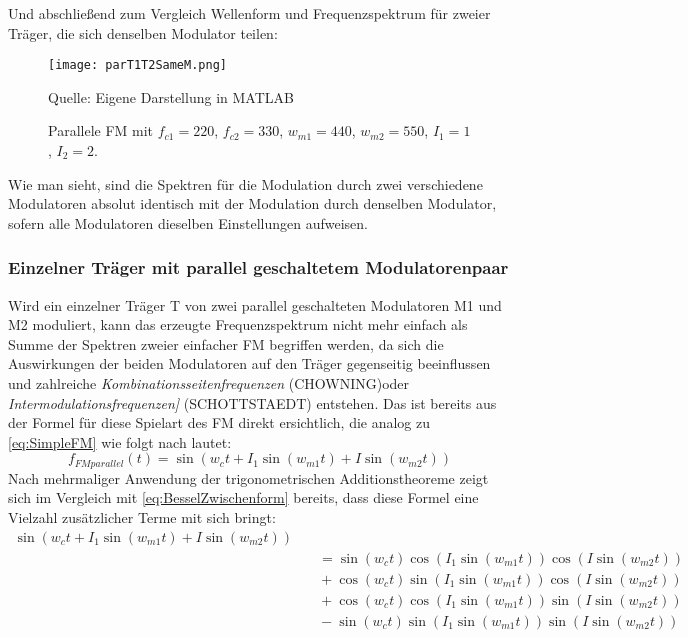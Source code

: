 \FloatBarrier
Und abschließend zum Vergleich Wellenform und Frequenzspektrum für zweier Träger, die sich denselben Modulator teilen:
\FloatBarrier
\begin{figure} [ht]
\centering
  \texttt{[image: parT1T2SameM.png]}
\caption{Parallele FM mit $f_{c1} = 220$, $f_{c2} = 330$, $w_{m1} = 440$, $w_{m2} = 550$, $I_1 = 1$, $I_2 = 2$.  }
Quelle: Eigene Darstellung in MATLAB
\end{figure}
\FloatBarrier
Wie man sieht, sind die Spektren für die Modulation durch zwei verschiedene Modulatoren absolut identisch mit der Modulation durch denselben Modulator, sofern alle Modulatoren dieselben Einstellungen aufweisen.

\subsubsection{Einzelner Träger mit parallel geschaltetem Modulatorenpaar}
\label{singlecarryparallelmod}
Wird ein einzelner Träger T von zwei parallel geschalteten Modulatoren M1 und M2 moduliert, kann das erzeugte Frequenzspektrum nicht mehr einfach als Summe der Spektren zweier einfacher FM begriffen werden, da sich die Auswirkungen der beiden Modulatoren auf den Träger gegenseitig beeinflussen und zahlreiche \textit{Kombinationsseitenfrequenzen} (CHOWNING)oder \textit{Intermodulationsfrequenzen]} (SCHOTTSTAEDT) entstehen. Das ist bereits aus der Formel für diese Spielart des FM direkt ersichtlich, die analog zu \ref{eq:SimpleFM} wie folgt nach \cite[S.46]{schottstaedt}lautet:
\begin{equation}
f_{FMparallel}(t) = \sin(w_ct + I_1\sin(w_{m1}t) + I\sin(w_{m2}t))
\end{equation}
Nach mehrmaliger Anwendung der trigonometrischen Additionstheoreme zeigt sich im Vergleich mit \ref{eq:BesselZwischenform} bereits, dass diese Formel eine Vielzahl zusätzlicher Terme mit sich bringt:
\begin{equation}
\begin{split}
\sin(w_ct + I_1\sin(w_{m1}t) + I\sin(w_{m2}t)) \\ &\quad = \sin(w_ct)\cos(I_1\sin(w_{m1}t))\cos(I\sin(w_{m2}t)) \\ &\quad + \cos(w_ct)\sin(I_1\sin(w_{m1}t))\cos(I\sin(w_{m2}t)) \\ &\quad +\cos(w_ct)\cos(I_1\sin(w_{m1}t))\sin(I\sin(w_{m2}t)) \\ &\quad -\sin(w_ct)\sin(I_1\sin(w_{m1}t))\sin(I\sin(w_{m2}t))
\end{split}
\end{equation}
